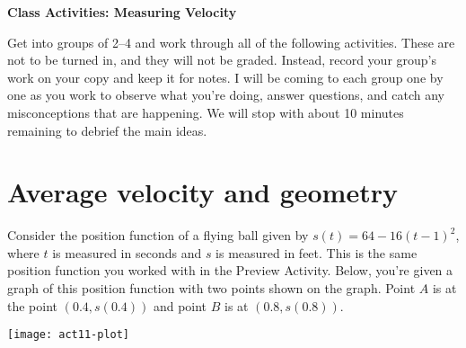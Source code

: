 \documentclass[11pt]{article}
\begin{document}
	
	\thispagestyle{empty}
	\renewcommand{\headrulewidth}{0.0pt}
	\thispagestyle{fancy}
	\lfoot{}
	\cfoot{}
	\rfoot{}	
	
	\vspace*{0in}

		\begin{center}
			\begin{large}
			\textbf{Class Activities: Measuring Velocity} \\
			\end{large}
		\end{center}
	
Get into groups of 2--4 and work through all of the following activities. These are not to be turned in, and they will not be graded. Instead, record your group's work on your copy and keep it for notes. I will be coming to each group one by one as you work to observe what you're doing, answer questions, and catch any misconceptions that are happening. We will stop with about 10 minutes remaining to debrief the main ideas. 


\section{Average velocity and geometry}

Consider the position function of a flying ball given by $s(t) = 64 - 16(t-1)^2$, where $t$ is measured in seconds and $s$ is measured in feet. This is the same position function you worked with in the Preview Activity. Below, you're given a graph of this position function with two points shown on the graph. Point $A$ is at the point $(0.4, s(0.4))$ and point $B$ is at $(0.8, s(0.8))$. 

\begin{center}
	\texttt{[image: act11-plot]}
\end{center}
\end{document}

